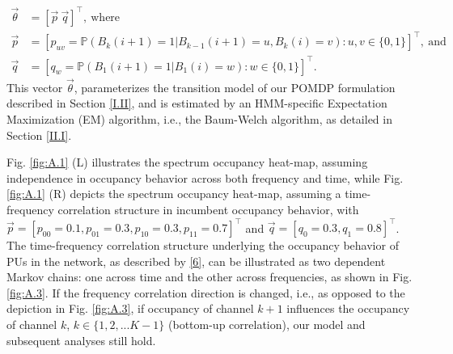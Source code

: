 \documentclass[12pt, draftcls, onecolumn]{IEEEtran}
\begin{document}
\begin{equation}\label{7}
    \begin{aligned}
        \vec{\theta}&=[\vec{p}\ \vec{q}]^{\intercal},\ \text{where}\\
        \vec{p}&=[p_{uv}=\mathbb{P}(B_{k}(i+1)=1|B_{k-1}(i+1)=u,B_{k}(i)=v):u,v \in \{0,1\}]^{\intercal},\ \text{and}\\
        \vec{q}&=[q_{w}=\mathbb{P}(B_{1}(i+1)=1|B_{1}(i)=w):w \in \{0,1\}]^{\intercal}.
    \end{aligned}
\end{equation}
This vector $\vec{\theta}$, parameterizes the transition model of our POMDP formulation described in Section \ref{I.II}, and is estimated by an HMM-specific Expectation Maximization (EM) algorithm, i.e., the Baum-Welch algorithm, as detailed in Section \ref{II.I}.

Fig. \ref{fig:A.1} (L) illustrates the spectrum occupancy heat-map, assuming independence in occupancy behavior across both frequency and time, while Fig. \ref{fig:A.1} (R) depicts the spectrum occupancy heat-map, assuming a time-frequency correlation structure in incumbent occupancy behavior, with $\vec{p}{=}[p_{00}{=}0.1,p_{01}{=}0.3,p_{10}{=}0.3,p_{11}{=}0.7]^{\intercal}$ and $\vec{q}=[q_{0}{=}0.3,q_{1}{=}0.8]^{\intercal}$. The time-frequency correlation structure underlying the occupancy behavior of PUs in the network, as described by \eqref{6}, can be illustrated as two dependent Markov chains: one across time and the other across frequencies, as shown in Fig. \ref{fig:A.3}. If the frequency correlation direction is changed, i.e., as opposed to the depiction in Fig. \ref{fig:A.3}, if occupancy of channel $k+1$ influences the occupancy of channel $k$, $k{\in}\{1,2,...K{-}1\}$ (bottom-up correlation), our model and subsequent analyses still hold.
\end{document}
